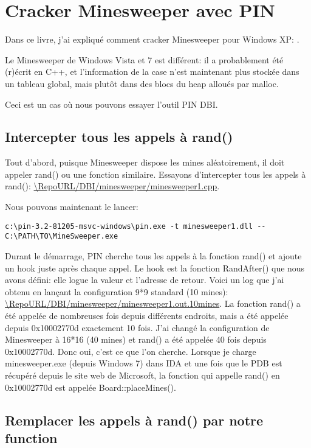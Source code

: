 \section{Cracker Minesweeper avec PIN}

\newcommand{\RepoMinesweeperURL}{\RepoURL/DBI/minesweeper}

Dans ce livre, j'ai expliqué comment cracker Minesweeper pour Windows XP: .

Le Minesweeper de Windows Vista et 7 est différent: il a probablement été (r)écrit
en C++, et l'information de la case n'est maintenant plus stockée dans un tableau
global, mais plutôt dans des blocs du heap alloués par malloc.

Ceci est un cas où nous pouvons essayer l'outil PIN DBI.

\subsection{Intercepter tous les appels à rand()}

Tout d'abord, puisque Minesweeper dispose les mines aléatoirement, il doit appeler
rand() ou une fonction similaire.
Essayons d'intercepter tous les appels à rand(): \url{\RepoMinesweeperURL/minesweeper1.cpp}.

Nous pouvons maintenant le lancer:

\begin{lstlisting}
c:\pin-3.2-81205-msvc-windows\pin.exe -t minesweeper1.dll -- C:\PATH\TO\MineSweeper.exe
\end{lstlisting}

Durant le démarrage, PIN cherche tous les appels à la fonction rand() et ajoute un
hook juste après chaque appel.
Le hook est la fonction RandAfter() que nous avons défini: elle logue la valeur et l'adresse
de retour.
Voici un log que j'ai obtenu en lançant la configuration 9*9 standard (10 mines):
 \url{\RepoMinesweeperURL/minesweeper1.out.10mines}.
La fonction rand() a été appelée de nombreuses fois depuis différents endroits, mais
a été appelée depuis 0x10002770d exactement 10 fois.
J'ai changé la configuration de Minesweeper à 16*16 (40 mines) et rand() a été appelée
40 fois depuis 0x10002770d.
Donc oui, c'est ce que l'on cherche.
Lorsque je charge minesweeper.exe (depuis Windows 7) dans IDA et une fois que le
PDB est récupéré depuis le site web de Microsoft, la fonction qui appelle rand()
en 0x10002770d est appelée Board::placeMines().

\subsection{Remplacer les appels à rand() par notre function}

